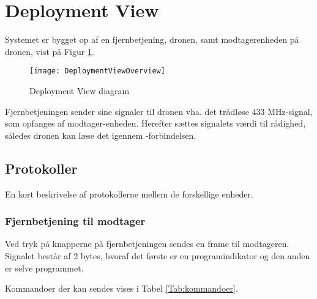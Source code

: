 \documentclass[Main]{subfiles}
\begin{document}
\section{Deployment View}
Systemet er bygget op af en fjernbetjening, dronen, samt modtagerenheden på dronen, vist på Figur \ref{Fig:DeploymentViewOverview}.

\begin{figure}[H]
\centering
\texttt{[image: DeploymentViewOverview]}
\caption{Deployment View diagram}
\label{Fig:DeploymentViewOverview}
\end{figure}

Fjernbetjeningen sender sine signaler til dronen vha. det trådløse 433 MHz-signal, som opfanges af modtager-enheden.
Herefter sættes signalets værdi til rådighed, således dronen kan læse det igennem \itoc -forbindelsen.


\newpage
\subsection{Protokoller}
En kort beskrivelse af protokollerne mellem de forskellige enheder.

\subsubsection{Fjernbetjening til modtager}
Ved tryk på knapperne på fjernbetjeningen sendes en frame til modtageren.
Signalet består af 2 bytes, hvoraf det første er en programindikator og den anden er selve programmet.



Kommandoer der kan sendes vises i Tabel \ref{Tab:kommandoer}.
\end{document}
